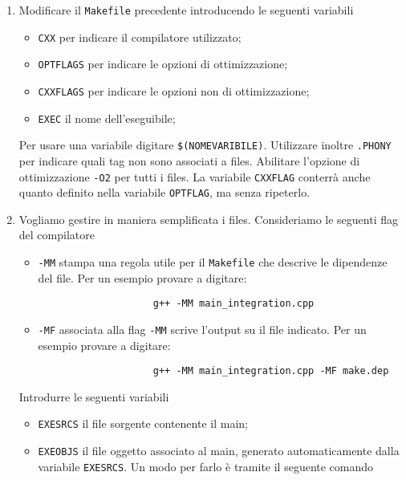 \begin{enumerate}
\begin{verbatim}
		clean :
        	rm edit main.o kbd.o command.o 
	\end{verbatim}
	utilizzando per la compilazione di ciascun file l'opzione \texttt{-Wall}. Fare attenzione che i files sono contenuti nella sotto cartella \texttt{src}, alle dipendenze dei files e alle eventuali chiamate ``a vuoto'' di \texttt{clean}.
	\item Modificare il \texttt{Makefile} precedente introducendo le seguenti variabili
		\begin{itemize}
			\item \texttt{CXX} per indicare il compilatore utilizzato;
			\item \texttt{OPTFLAGS} per indicare le opzioni di ottimizzazione;
			\item \texttt{CXXFLAGS} per indicare le opzioni non di ottimizzazione;
			\item \texttt{EXEC} il nome dell'eseguibile;
		\end{itemize}
		Per usare una variabile digitare \texttt{\$(NOMEVARIBILE)}. Utilizzare inoltre \texttt{.PHONY} per indicare quali tag non sono associati a files. Abilitare l'opzione di ottimizzazione \texttt{-O2} per tutti i files. La variabile \texttt{CXXFLAG} conterr\`a anche quanto definito nella variabile \texttt{OPTFLAG}, ma senza ripeterlo.
		\item Vogliamo gestire in maniera semplificata i files. Consideriamo le seguenti flag del compilatore
			\begin{itemize}
				\item \texttt{-MM} stampa una regola utile per il \texttt{Makefile} che descrive le dipendenze del file. Per un esempio provare a digitare:
				\begin{verbatim}
					g++ -MM main_integration.cpp
				\end{verbatim}
				\item \texttt{-MF} associata alla flag \texttt{-MM} scrive l'output su il file indicato. Per un esempio provare a digitare:
				\begin{verbatim}
					g++ -MM main_integration.cpp -MF make.dep
				\end{verbatim}
			\end{itemize}
			Introdurre le seguenti variabili
			\begin{itemize}
				\item \texttt{EXESRCS} il file sorgente contenente il main;
				\item \texttt{EXEOBJS} il file oggetto associato al main, generato automaticamente dalla variabile \texttt{EXESRCS}. Un modo per farlo \`e tramite il seguente comando

\end{itemize}
\end{enumerate}
